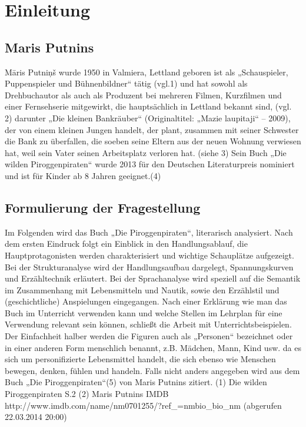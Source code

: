 \chapter{Einleitung}

\section{Maris Putnins}
Māris Putniņš wurde 1950 in Valmiera, Lettland geboren ist als „Schauspieler, Puppenspieler und Bühnenbildner“ tätig (vgl.1) und hat sowohl als Drehbuchautor als auch als Produzent bei mehreren Filmen, Kurzfilmen und einer Fernsehserie mitgewirkt, die hauptsächlich in Lettland bekannt  sind, (vgl. 2) darunter „Die kleinen Bankräuber“ (Originaltitel: „Mazie laupitaji“ – 2009), der von einem kleinen Jungen handelt, der plant, zusammen  mit seiner Schwester die Bank zu überfallen, die soeben seine Eltern aus der neuen Wohnung verwiesen hat, weil sein Vater seinen Arbeitsplatz verloren hat. (siehe 3) 
Sein Buch „Die wilden Piroggenpiraten“ wurde 2013 für den Deutschen Literaturpreis nominiert und ist für Kinder ab 8 Jahren geeignet.(4)

\section{Formulierung der Fragestellung}
Im Folgenden wird das Buch „Die Piroggenpiraten“, literarisch analysiert. Nach dem ersten Eindruck folgt ein Einblick in den Handlungsablauf, die Hauptprotagonisten werden charakterisiert und wichtige Schauplätze aufgezeigt. Bei der Strukturanalyse wird der Handlungsaufbau dargelegt, Spannungskurven und Erzähltechnik erläutert. Bei der Sprachanalyse wird speziell auf die Semantik im Zusammenhang mit Lebensmitteln und Nautik, sowie den Erzählstil und (geschichtliche) Anspielungen eingegangen. Nach einer Erklärung wie man das Buch im Unterricht verwenden kann und welche Stellen im Lehrplan für eine Verwendung relevant sein können, schließt die Arbeit mit Unterrichtsbeispielen. Der Einfachheit halber werden die Figuren auch als „Personen“ bezeichnet oder in einer anderen Form menschlich benannt, z.B. Mädchen, Mann, Kind usw. da es sich um personifizierte Lebensmittel handelt, die sich ebenso wie Menschen bewegen, denken, fühlen und handeln. Falls nicht anders angegeben wird aus dem Buch „Die Piroggenpiraten“(5) von Maris Putnins zitiert.
(1) Die wilden Piroggenpiraten S.2 
(2) Maris Putnins IMDB 
	http://www.imdb.com/name/nm0701255/?ref_=nmbio_bio_nm
		(abgerufen 22.03.2014 20:00)

